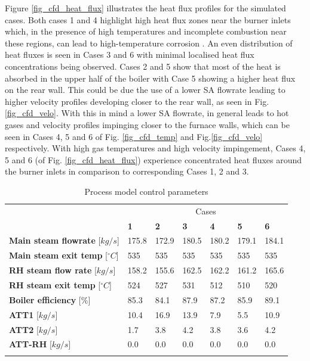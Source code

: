 \documentclass[11pt,cleanfoot]{asme2ej}
\begin{document}
\newpage
Figure \ref{fig_cfd_heat_flux} illustrates the heat flux profiles for the simulated cases. Both cases 1 and 4 highlight high heat flux zones near the burner inlets which, in the presence of high temperatures and incomplete combustion near these regions, can lead to high-temperature corrosion \cite{ugum2019}. An even distribution of heat fluxes is seen in Cases 3 and 6 with minimal localised heat flux concentrations being observed. Cases 2 and 5 show that most of the heat is absorbed in the upper half of the boiler with Case 5 showing a higher heat flux on the rear wall. This could be due the use of a lower SA flowrate leading to higher velocity profiles developing closer to the rear wall, as seen in Fig. \ref{fig_cfd_velo}. With this in mind a lower SA flowrate, in general leads to hot gases and velocity profiles impinging closer to the furnace walls, which can be seen in Cases 4, 5 and 6 of Fig. \ref{fig_cfd_temp} and Fig.\ref{fig_cfd_velo} respectively. With high gas temperatures and high velocity impingement, Cases 4, 5 and 6 (of Fig. \ref{fig_cfd_heat_flux}) experience concentrated heat fluxes around the burner inlets in comparison to corresponding Cases 1, 2 and 3.
\begin{table}[h!]
\centering
\caption{Process model control parameters}
\vspace{2mm}
\begin{tabularx}{\textwidth}{p{} XXXXXX}
\hline
&\multicolumn{6}{c}{Cases}\\
 & \textbf{1} & \textbf{2} & \textbf{3}& \textbf{4}&\textbf{5}&\textbf{6}\\
\hline
\textbf{Main steam flowrate} 	[$kg/s$]		&175.8&172.9&180.5&180.2&179.1&184.1 \\
\textbf{Main steam exit temp} 	[$^{\circ}C$]	&535& 535 &535&535 &535& 535\\
\textbf{RH steam flow rate} 	[$kg/s$]		&158.2&155.6&162.5&162.2&161.2&165.6\\
\textbf{RH steam exit temp} 	[$^{\circ}C$]	&524&527&531&512&510&520\\
\textbf{Boiler efficiency} 		[$\%$]			&85.3&84.1&87.9	&87.2&85.9&89.1\\
\textbf{ATT1} 		[$kg/s$]					&10.4&16.9&13.9&7.9&5.5&10.9\\
\textbf{ATT2} 		[$kg/s$]					&1.7&3.8&4.2&3.8&3.6&4.2\\
\textbf{ATT-RH} 		[$kg/s$]				&0.0&0.0&0.0&0.0&0.0&0.0\\
\hline
\label{tbl_process_parameters}
\end{tabularx}
\end{table}
\end{document}
